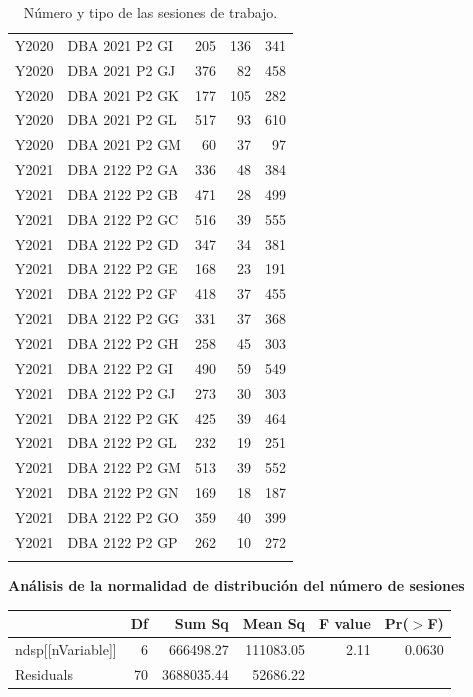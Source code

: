 \begin{longtable}{llrrr}
Y2020 & DBA 2021 P2 GI &   205 &     136 &  341 \\
Y2020 & DBA 2021 P2 GJ &   376 &      82 &  458 \\
Y2020 & DBA 2021 P2 GK &   177 &     105 &  282 \\
Y2020 & DBA 2021 P2 GL &   517 &      93 &  610 \\
Y2020 & DBA 2021 P2 GM &    60 &      37 &   97 \\
Y2021 & DBA 2122 P2 GA &   336 &      48 &  384 \\
Y2021 & DBA 2122 P2 GB &   471 &      28 &  499 \\
Y2021 & DBA 2122 P2 GC &   516 &      39 &  555 \\
Y2021 & DBA 2122 P2 GD &   347 &      34 &  381 \\
Y2021 & DBA 2122 P2 GE &   168 &      23 &  191 \\
Y2021 & DBA 2122 P2 GF &   418 &      37 &  455 \\
Y2021 & DBA 2122 P2 GG &   331 &      37 &  368 \\
Y2021 & DBA 2122 P2 GH &   258 &      45 &  303 \\
Y2021 & DBA 2122 P2 GI &   490 &      59 &  549 \\
Y2021 & DBA 2122 P2 GJ &   273 &      30 &  303 \\
Y2021 & DBA 2122 P2 GK &   425 &      39 &  464 \\
Y2021 & DBA 2122 P2 GL &   232 &      19 &  251 \\
Y2021 & DBA 2122 P2 GM &   513 &      39 &  552 \\
Y2021 & DBA 2122 P2 GN &   169 &      18 &  187 \\
Y2021 & DBA 2122 P2 GO &   359 &      40 &  399 \\
Y2021 & DBA 2122 P2 GP &   262 &      10 &  272 \\
\hline
\caption{Número y tipo de las sesiones de trabajo.}
\label{tab:type}
\end{longtable}

\textbf{Análisis de la normalidad de distribución del número de sesiones}

\begin{table}[H]
\centering
\begin{tabular}{lrrrrr}
  \hline
 & Df & Sum Sq & Mean Sq & F value & Pr($>$F) \\ 
  \hline
ndsp[[nVariable]] & 6 & 666498.27 & 111083.05 & 2.11 & 0.0630 \\ 
  Residuals         & 70 & 3688035.44 & 52686.22 &  &  \\ 
   \hline
\end{tabular}
\end{table}

